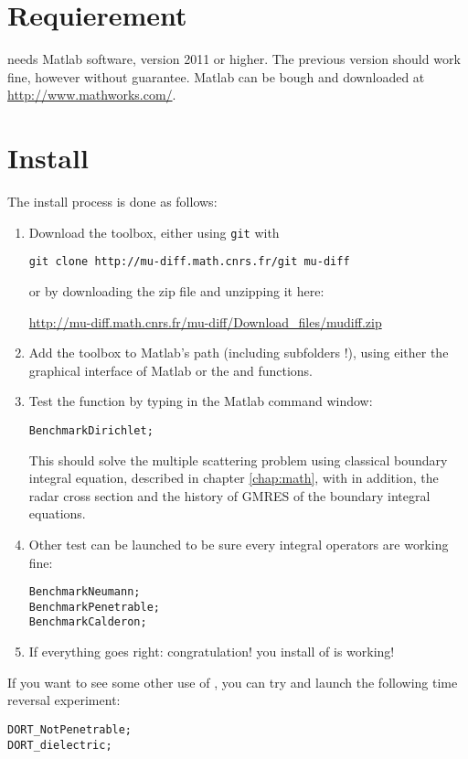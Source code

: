 \mtcaddchapter[Installation]                          %

\section*{Requierement}

\mudiff needs Matlab software, version 2011 or higher. The previous version should work fine, however without guarantee. Matlab can be bough and downloaded at \url{http://www.mathworks.com/}.

\section*{Install}

The install process is done as follows:
\begin{enumerate}
\item Download the \mudiff toolbox, either using \texttt{git} with
\begin{verbatim}
git clone http://mu-diff.math.cnrs.fr/git mu-diff
\end{verbatim} 
or by downloading the zip file and unzipping it here:
\begin{center}
\url{http://mu-diff.math.cnrs.fr/mu-diff/Download_files/mudiff.zip}
\end{center}
\item Add the \mudiff toolbox to Matlab's path (including subfolders !), using either the graphical interface of Matlab or the  and  functions.
\item Test the \mudiff function by typing in the Matlab command window:
\begin{lstlisting}
BenchmarkDirichlet;
\end{lstlisting}
This should solve the multiple scattering problem using classical boundary integral equation, described in chapter \ref{chap:math}, with in addition, the radar cross section and the history of GMRES of the boundary integral equations.
\item Other test can be launched to be sure every integral operators are working fine:
\begin{lstlisting}
BenchmarkNeumann;
BenchmarkPenetrable;
BenchmarkCalderon;
\end{lstlisting}
\item If everything goes right: congratulation! you install of \mudiff is working!
\end{enumerate}

If you want to see some other use of \mudiff, you can try and launch the following time reversal experiment:
\begin{lstlisting}
DORT_NotPenetrable;
DORT_dielectric;
\end{lstlisting}
